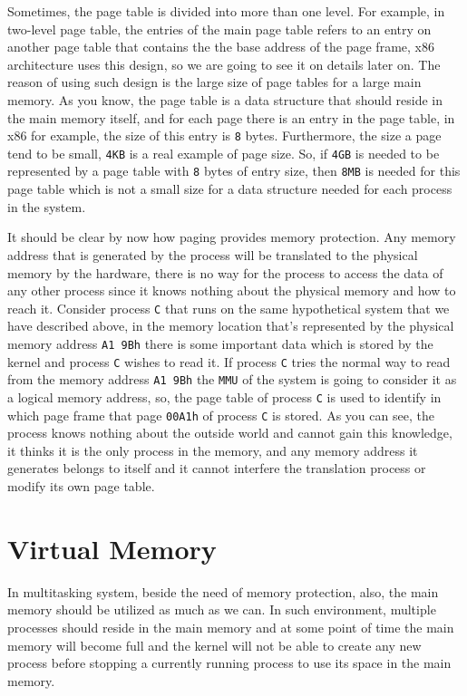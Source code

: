 Sometimes, the page table is divided into more than one level. For
example, in two-level page table, the entries of the main page table
refers to an entry on another page table that contains the the base
address of the page frame, x86 architecture uses this design, so we are
going to see it on details later on. The reason of using such design is
the large size of page tables for a large main memory. As you know, the
page table is a data structure that should reside in the main memory
itself, and for each page there is an entry in the page table, in x86
for example, the size of this entry is \lstinline!8! bytes. Furthermore,
the size a page tend to be small, \lstinline!4KB! is a real example of
page size. So, if \lstinline!4GB! is needed to be represented by a page
table with \lstinline!8! bytes of entry size, then \lstinline!8MB! is
needed for this page table which is not a small size for a data
structure needed for each process in the system.

It should be clear by now how paging provides memory protection. Any
memory address that is generated by the process will be translated to
the physical memory by the hardware, there is no way for the process to
access the data of any other process since it knows nothing about the
physical memory and how to reach it. Consider process \lstinline!C! that
runs on the same hypothetical system that we have described above, in
the memory location that's represented by the physical memory address
\lstinline!A1 9Bh! there is some important data which is stored by the
kernel and process \lstinline!C! wishes to read it. If process
\lstinline!C! tries the normal way to read from the memory address
\lstinline!A1 9Bh! the \lstinline!MMU! of the system is going to
consider it as a logical memory address, so, the page table of process
\lstinline!C! is used to identify in which page frame that page
\lstinline!00A1h! of process \lstinline!C! is stored. As you can see,
the process knows nothing about the outside world and cannot gain this
knowledge, it thinks it is the only process in the memory, and any
memory address it generates belongs to itself and it cannot interfere
the translation process or modify its own page table.

\section{Virtual Memory}\label{virtual-memory}

In multitasking system, beside the need of memory protection, also, the
main memory should be utilized as much as we can. In such environment,
multiple processes should reside in the main memory and at some point of
time the main memory will become full and the kernel will not be able to
create any new process before stopping a currently running process to
use its space in the main memory.

